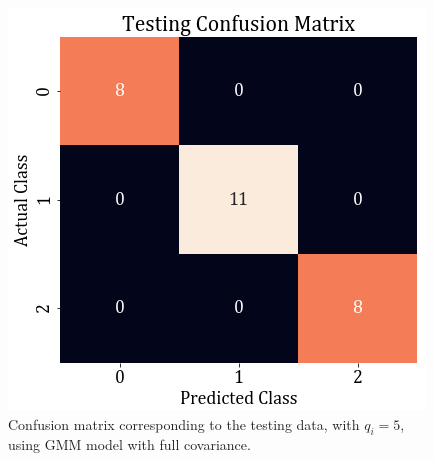 \documentclass[11pt,a4paper]{article}
\begin{document}
\begin{figure}[H]
    \centering
    \includegraphics[scale=0.5]{images/1B/1b_full_test_conf.png}
    \caption{Confusion matrix corresponding to the testing data, with $q_i=5$, using GMM model with full covariance.}
\end{figure}
\end{document}
